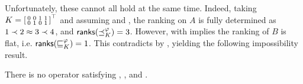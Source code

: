 Unfortunately, these cannot all hold at the same time. Indeed, taking
$
    K = \left[\begin{smallmatrix}
        0 & 0 & 1 & 1 \\
        0 & 1 & 0 & 1
    \end{smallmatrix}\right]^\top
$
and assuming  and , the ranking on $A$ is
fully determined as $1 \prec 2 \approx 3 \prec 4$, and $\mathsf{ranks}({\preceq_K^\varphi}) = 3$.
However,  with  implies the ranking of $B$ is
flat, i.e.  $\mathsf{ranks}({\sqsubseteq_K^\varphi}) = 1$. This contradicts  by
, yielding the following
impossibility result.

\begin{theorem}
    \label{tourn_result_chaindef_impossibility}

    There is no operator satisfying , ,
     and .

\end{theorem}

